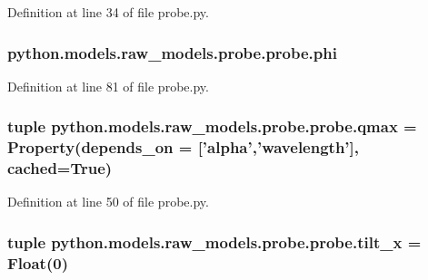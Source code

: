 Definition at line 34 of file probe.\-py.

\hypertarget{classpython_1_1models_1_1raw__models_1_1probe_1_1probe_a9cf5e99b1f503ffcec65bde094d88f46}{
\subsubsection[{phi}]{\setlength{\rightskip}{0pt plus 5cm}python.\-models.\-raw\-\_\-models.\-probe.\-probe.\-phi}}\label{classpython_1_1models_1_1raw__models_1_1probe_1_1probe_a9cf5e99b1f503ffcec65bde094d88f46}


Definition at line 81 of file probe.\-py.

\hypertarget{classpython_1_1models_1_1raw__models_1_1probe_1_1probe_a82115672312ef5da163eb66544fe2237}{
\subsubsection[{qmax}]{\setlength{\rightskip}{0pt plus 5cm}tuple python.\-models.\-raw\-\_\-models.\-probe.\-probe.\-qmax = Property(depends\-\_\-on = \mbox{[}'{\bf alpha}','{\bf wavelength}'\mbox{]}, cached=True)\hspace{0.3cm}{\ttfamily [static]}}}\label{classpython_1_1models_1_1raw__models_1_1probe_1_1probe_a82115672312ef5da163eb66544fe2237}


Definition at line 50 of file probe.\-py.

\hypertarget{classpython_1_1models_1_1raw__models_1_1probe_1_1probe_a0f1b68b57f10016771e973c37cd743ef}{
\subsubsection[{tilt\-\_\-x}]{\setlength{\rightskip}{0pt plus 5cm}tuple python.\-models.\-raw\-\_\-models.\-probe.\-probe.\-tilt\-\_\-x = Float(0)\hspace{0.3cm}{\ttfamily [static]}}}\label{classpython_1_1models_1_1raw__models_1_1probe_1_1probe_a0f1b68b57f10016771e973c37cd743ef}


